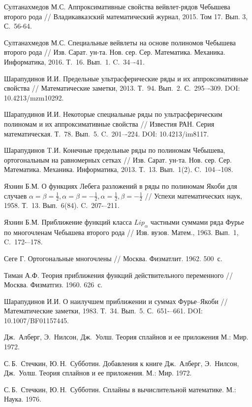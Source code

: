 \begin{thebibliography}{1}
 Султанахмедов М.С. Аппроксимативные свойства вейвлет-рядов Чебышева второго рода  // Владикавказский математический журнал, 2015. Том 17. Вып. 3, С.~56-64.

 Султанахмедов М.С. Специальные вейвлеты на основе полиномов Чебышева второго рода  //
Изв. Сарат. ун-та. Нов. сер. Сер. Математика. Механика. Информатика, 2016. Т.~16. Вып.~1. C.~34–-41.


 Шарапудинов И.И. Предельные ультрасферические ряды и их аппроксимативные свойства // Математические заметки, 2013. Т.~94. Вып.~2. С.~295–-309. DOI: 10.4213/mzm10292.

 Шарапудинов И.И. Некоторые специальные ряды по ультрасферическим полиномам и их аппроксимативные свойства // Известия РАН. Серия математическая. Т.~78. Вып.~5. C.~201–-224.  DOI: 10.4213/im8117.


 Шарапудинов T.И.
Конечные предельные ряды по полиномам Чебышева, ортогональным на равномерных сетках
// Изв. Сарат. ун-та. Нов. сер. Сер. Математика. Механика. Информатика, 2013. Т.~13. Вып.~1(2). C.~104–-108.


 Яхнин Б.М. О функциях Лебега разложений в ряды по полиномам Якоби для случаев $\alpha=\beta=\frac12, \alpha=\beta=-\frac12, \alpha=\frac12, \beta=-\frac12$ // Успехи математических наук, 1958. Т.~13. Вып.~6(84). C.~207-–211.

 Яхнин Б.М. Приближение функций класса $Lip_\alpha$ частными суммами ряда Фурье по многочленам Чебышева второго рода // Изв. вузов. Матем., 1963. Вып.~1, C.~172-–178.

 Сеге Г. Ортогональные многочлены // Москва. Физматлит. 1962. 500~с.

 Тиман А.Ф. Теория приближения функций действительного переменного // Москва. Физматгиз. 1960. 626~с.

 Шарапудинов И.И. О наилучшем приближении и суммах Фурье–Якоби // Математические заметки, 1983. Т.~34. Вып.~5. С.~651-–661. DOI: 10.1007/BF01157445.

  Дж.~Алберг, Э.~Нилсон, Дж.~Уолш. Теория сплайнов и ее приложения  М.: Мир. 1972.

  С.\,Б.~Стечкин, Ю.\,Н.~Субботин. Добавления к книге Дж.~Алберг, Э.~Нилсон, Дж.~Уолш.
 Теория сплайнов и ее приложения.  М.: Мир. 1972.

 С.\,Б.~Стечкин, Ю.\,Н.~Субботин.  Сплайны в вычислительной математике. М.:  Наука. 1976.


\end{thebibliography}
